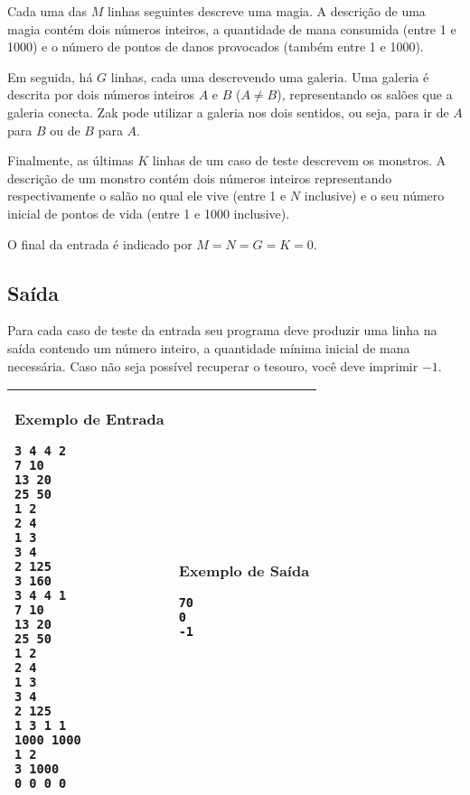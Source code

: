 Cada uma das $M$ linhas seguintes descreve uma magia. A descrição de uma magia
contém dois números inteiros, a quantidade de mana consumida (entre 1 e 1000) e
o número de pontos de danos provocados (também entre 1 e 1000).

Em seguida, há $G$ linhas, cada uma descrevendo uma galeria. Uma galeria é
descrita por dois números inteiros $A$ e $B$ ($A \neq B$), representando os salões que a
galeria conecta. Zak pode utilizar a galeria nos dois sentidos, ou seja, para ir
de $A$ para $B$ ou de $B$ para $A$.

Finalmente, as últimas $K$ linhas de um caso de teste descrevem os monstros. A
descrição de um monstro contém dois números inteiros representando
respectivamente o salão no qual ele vive (entre 1 e $N$ inclusive) e o seu número
inicial de pontos de vida (entre 1 e 1000 inclusive).

O final da entrada é indicado por $M = N = G = K = 0$.

\subsection*{Saída}

Para cada caso de teste da entrada seu programa deve produzir uma linha na saída
contendo um número inteiro, a quantidade mínima inicial de mana necessária. Caso
não seja possível recuperar o tesouro, você deve imprimir $-1$.

\begin{table}[!h]
\centering
\begin{tabular}{|l|l|}
\hline
\begin{minipage}[t]{3in}
\textbf{Exemplo de Entrada}
\begin{verbatim}
3 4 4 2
7 10
13 20
25 50
1 2
2 4
1 3
3 4
2 125
3 160
3 4 4 1
7 10
13 20
25 50
1 2
2 4
1 3
3 4
2 125
1 3 1 1
1000 1000
1 2
3 1000
0 0 0 0
\end{verbatim}
\vspace{1mm}
\end{minipage}
&

\begin{minipage}[t]{3in}
\textbf{Exemplo de Saída}
\begin{verbatim}
70
0
-1
\end{verbatim}
\vspace{1mm}
\end{minipage} \\
\hline
\end{tabular}
\end{table}

\newpage
